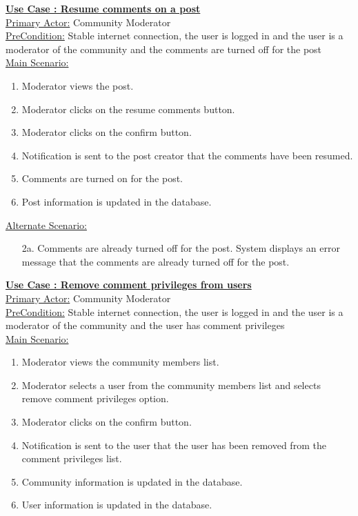 \documentclass[conference,compsoc]{IEEEtran}
\newcounter{UC}
\newcommand{\nextU}{\stepcounter{UC}\theUC}
\begin{document}
\underline{\textbf{Use Case \nextU: Resume comments on a post}}\\

\underline{Primary Actor:} Community Moderator\\

\underline{PreCondition:} Stable internet connection, the user is logged in and the user is a moderator of the community and the comments are turned off for the post\\

\underline{Main Scenario:}\\
\begin{enumerate}
    \item Moderator views the post.
    \item Moderator clicks on the resume comments button.
    \item Moderator clicks on the confirm button.
    \item Notification is sent to the post creator that the comments have been resumed.
    \item Comments are turned on for the post.
    \item Post information is updated in the database.
\end{enumerate}

\underline{Alternate Scenario:}\\
\begin{enumerate}
    \item [2a.] Comments are already turned off for the post. System displays an error message that the comments are already turned off for the post.
\end{enumerate}

\underline{\textbf{Use Case \nextU: Remove comment privileges from users}}\\

\underline{Primary Actor:} Community Moderator\\

\underline{PreCondition:} Stable internet connection, the user is logged in and the user is a moderator of the community and the user has comment privileges\\

\underline{Main Scenario:}\\
\begin{enumerate}
    \item Moderator views the community members list.
    \item Moderator selects a user from the community members list and selects remove comment privileges option.
    \item Moderator clicks on the confirm button.
    \item Notification is sent to the user that the user has been removed from the comment privileges list.
    \item Community information is updated in the database.
    \item User information is updated in the database.
\end{enumerate}
\end{document}
